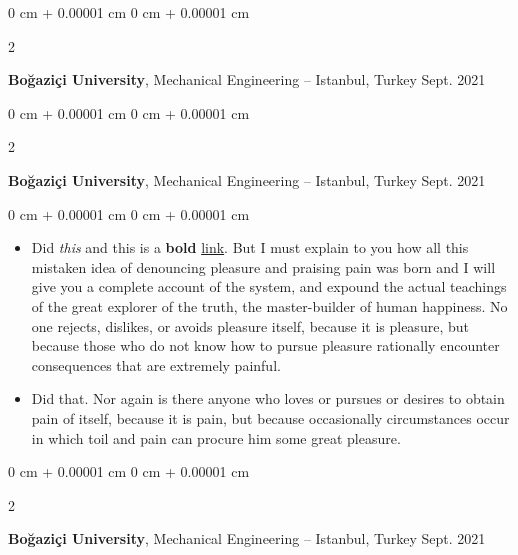 \documentclass[10pt, letterpaper]{article}
\newenvironment{highlights}{
    \begin{itemize}[
        topsep=0.10 cm,
        parsep=0.10 cm,
        partopsep=0pt,
        itemsep=0pt,
        leftmargin=0 cm + 10pt
    ]
}{
    \end{itemize}
} %
\newenvironment{onecolentry}{
    \begin{adjustwidth}{
        0 cm + 0.00001 cm
    }{
        0 cm + 0.00001 cm
    }
}{
    \end{adjustwidth}
} %
\newenvironment{twocolentry}[2][]{
    \onecolentry
    \def\secondColumn{#2}
    \setcolumnwidth{\fill, 4.5 cm}
    \begin{paracol}{2}
}{
    \switchcolumn \raggedleft \secondColumn
    \end{paracol}
    \endonecolentry
} %
\begin{document}
        \vspace{0.2 cm}

        \begin{twocolentry}{
            Sept. 2021
        }
            \textbf{Boğaziçi University}, Mechanical Engineering -- Istanbul, Turkey\end{twocolentry}



        \vspace{0.2 cm}

        \begin{twocolentry}{
            Sept. 2021
        }
            \textbf{Boğaziçi University}, Mechanical Engineering -- Istanbul, Turkey\end{twocolentry}

        \vspace{0.10 cm}
        \begin{onecolentry}
            \begin{highlights}
                \item Did \textit{this} and this is a \textbf{bold} \href{https://example.com}{link}. But I must explain to you how all this mistaken idea of denouncing pleasure and praising pain was born and I will give you a complete account of the system, and expound the actual teachings of the great explorer of the truth, the master-builder of human happiness. No one rejects, dislikes, or avoids pleasure itself, because it is pleasure, but because those who do not know how to pursue pleasure rationally encounter consequences that are extremely painful.
                \item Did that. Nor again is there anyone who loves or pursues or desires to obtain pain of itself, because it is pain, but because occasionally circumstances occur in which toil and pain can procure him some great pleasure.
            \end{highlights}
        \end{onecolentry}


        \vspace{0.2 cm}

        \begin{twocolentry}{
            Sept. 2021
        }
            \textbf{Boğaziçi University}, Mechanical Engineering -- Istanbul, Turkey\end{twocolentry}
\end{document}
